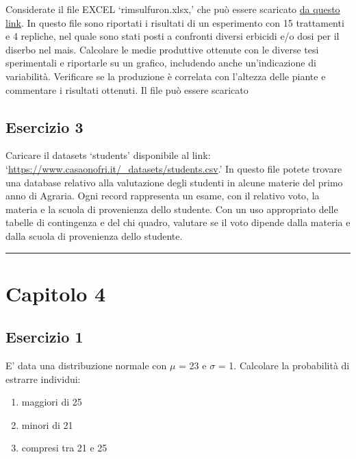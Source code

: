 \documentclass[a4paper,12pt,oneside]{book}
\providecommand{\tightlist}{%
  \setlength{\itemsep}{0pt}\setlength{\parskip}{0pt}}
\begin{document}
Considerate il file EXCEL `rimsulfuron.xlsx,' che può essere scaricato \href{https://www.casaonofri.it/_datasets/rimsulfuron.xlsx}{da questo link}. In questo file sono riportati i risultati di un esperimento con 15 trattamenti e 4 repliche, nel quale sono stati posti a confronti diversi erbicidi e/o dosi per il diserbo nel mais. Calcolare le medie produttive ottenute con le diverse tesi sperimentali e riportarle su un grafico, includendo anche un'indicazione di variabilità. Verificare se la produzione è correlata con l'altezza delle piante e commentare i risultati ottenuti. Il file può essere scaricato

\hypertarget{esercizio-3}{%
\subsection{Esercizio 3}\label{esercizio-3}}

Caricare il datasets `students' disponibile al link: `\url{https://www.casaonofri.it/_datasets/students.csv}.' In questo file potete trovare una database relativo alla valutazione degli studenti in alcune materie del primo anno di Agraria. Ogni record rappresenta un esame, con il relativo voto, la materia e la scuola di provenienza dello studente. Con un uso appropriato delle tabelle di contingenza e del chi quadro, valutare se il voto dipende dalla materia e dalla scuola di provenienza dello studente.

\begin{center}\rule{0.5\linewidth}{0.5pt}\end{center}

\hypertarget{capitolo-4}{%
\section{Capitolo 4}\label{capitolo-4}}

\hypertarget{esercizio-1-2}{%
\subsection{Esercizio 1}\label{esercizio-1-2}}

E' data una distribuzione normale con \(\mu\) = 23 e \(\sigma\) = 1. Calcolare la probabilità di estrarre individui:

\begin{enumerate}
\def\labelenumi{\arabic{enumi}.}
\tightlist
\item
  maggiori di 25
\item
  minori di 21
\item
  compresi tra 21 e 25
\end{enumerate}
\end{document}
